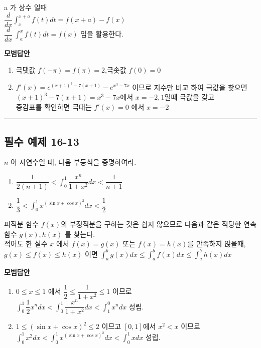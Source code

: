 \documentclass[a4paper,11pt]{article}
\begin{document}
\begin{studybox}
a 가 상수 일때 \\
$\dfrac{d}{dx} \displaystyle \int_{x}^{x+a} f(t) dt = f(x+a) - f(x)$\\
$\dfrac{d}{dx}\ \displaystyle \int_{a}^{x}f(t)dt=f(x)$ 임을 활용한다. 
\end{studybox}

\textbf{모범답안} \\
\begin{enumerate} [label=(\arabic*)]
    \item 극댓값 $f(-\pi)=f(\pi)=2$,극솟값 $f(0)=0$ 
    \item $f'(x)=e^{(x+1)^3-7(x+1)} - e^{x^3-7x}$ 이므로 지수만 비교 하여 극값을 찾으면 \\
    $(x+1)^3-7(x+1) = x^3-7x$에서 $x=-2, 1$일때 극값을 갖고 \\
    증감표를 확인하면 극대는 $f'(x)=0$ 에서 $x=-2$ 
\end{enumerate}

\vspace{0.5cm}
\hrule
\vspace{0.5cm}

\subsection*{필수 예제 16-13}
$n$ 이 자연수일 때, 다음 부등식을 증명하여라. 
\begin{enumerate}[label=(\arabic*)]
    \item $\dfrac{1}{2(n+1)} < \displaystyle \int_{0}^{1} \dfrac{x^n}{1+x^2} dx < \dfrac{1}{n+1}$
    \item $\dfrac{1}{3} < \displaystyle \int_{0}^{1} x^{( \sin x + \cos x )^2} dx < \dfrac{1}{2}$
\end{enumerate}

\begin{studybox}
피적분 함수 $f(x)$의 부정적분을 구하는 것은 쉽지 않으므로 다음과 같은 적당한 연속함수 $g(x), h(x)$ 를 찾는다.\\
적어도 한 실수 $x$ 에서 $f(x)=g(x)$ 또는 $f(x)=h(x)$를 만족하지 않을때,\\
 $g(x) \le f(x) \le h(x)$ 이면 $\displaystyle \int_{a}^{b} g(x) dx \le \int_{a}^{b} f(x) dx \le \int_{a}^{b} h(x) dx$ 
\end{studybox}

\textbf{모범답안} \\
\begin{enumerate} [label=(\arabic*)]
    \item $0 \le x \le 1$ 에서 $\dfrac{1}{2} \le \dfrac{1}{1+x^2} \le 1$ 이므로 \\
    $\int_{0}^{1}\dfrac{1}{2} x^n dx < \displaystyle \int_{0}^{1} \dfrac{x^n}{1+x^2} dx < \int_{1}^{0} x^n dx $ 성립.
    \item $1 \le (\sin x + \cos x)^2 \le 2$ 이므고 $[0,1]$에서 $ x^2 < x$ 이므로\\
    $ \int_{0}^{1} x^2 dx < \displaystyle \int_{0}^{1} x^{( \sin x + \cos x )^2} dx < \int_{0}^{1} x dx $ 성립. 
\end{enumerate}
\end{document}

